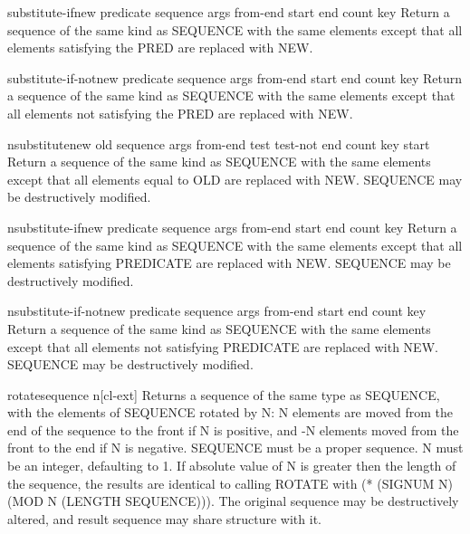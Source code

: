 \documentclass[10pt,english]{book}
\begin{document}
\begin{function}{substitute-if}{new predicate sequence \rest args \key from-end start end count key}
  Return a sequence of the same kind as SEQUENCE with the same elements
  except that all elements satisfying the PRED are replaced with NEW.
\end{function}

\begin{function}{substitute-if-not}{new predicate sequence \rest args \key from-end start end count key}
  Return a sequence of the same kind as SEQUENCE with the same elements
  except that all elements not satisfying the PRED are replaced with NEW.
\end{function}

\begin{function}{nsubstitute}{new old sequence \rest args \key from-end test test-not end count key start}
  Return a sequence of the same kind as SEQUENCE with the same elements
  except that all elements equal to OLD are replaced with NEW. SEQUENCE
  may be destructively modified.
\end{function}

\begin{function}{nsubstitute-if}{new predicate sequence \rest args \key from-end start end count key}
  Return a sequence of the same kind as SEQUENCE with the same elements
  except that all elements satisfying PREDICATE are replaced with NEW.
  SEQUENCE may be destructively modified.
\end{function}

\begin{function}{nsubstitute-if-not}{new predicate sequence \rest args \key from-end start end count key}
  Return a sequence of the same kind as SEQUENCE with the same elements
  except that all elements not satisfying PREDICATE are replaced with NEW.
  SEQUENCE may be destructively modified.
\end{function}

\begin{function}{rotate}{sequence \op n}[cl-ext]
  Returns a sequence of the same type as SEQUENCE, with the elements
  of SEQUENCE rotated by N: N elements are moved from the end of the
  sequence to the front if N is positive, and -N elements moved from
  the front to the end if N is negative. SEQUENCE must be a proper
  sequence. N must be an integer, defaulting to 1. If absolute value
  of N is greater then the length of the sequence, the results are
  identical to calling ROTATE with (* (SIGNUM N) (MOD N (LENGTH
  SEQUENCE))). The original sequence may be destructively altered, and
  result sequence may share structure with it.
\end{function}
\end{document}
